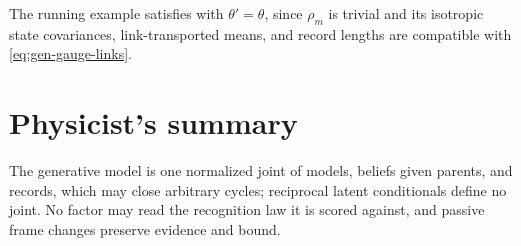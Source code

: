 The running example satisfies  with $\theta'=\theta$, since $\rho_m$ is
trivial and its isotropic state covariances, link-transported means, and record lengths are compatible
with \eqref{eq:gen-gauge-links}.

\section*{Physicist's summary}

The generative model is one normalized joint of models, beliefs given parents, and records, which may
close arbitrary cycles; reciprocal latent conditionals define no joint. No factor may read the
recognition law it is scored against, and passive frame changes preserve evidence and bound.

